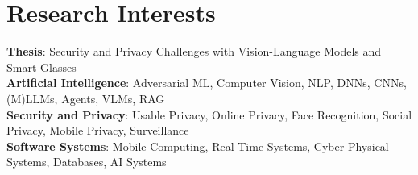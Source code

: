 \section{Research Interests}
 \begin{itemize}[leftmargin=0.5cm, label={}]
    \small{\item{
     \textbf{Thesis}{: Security and Privacy Challenges with Vision-Language Models and Smart Glasses~\cite{hawkeye}} \\\vspace{1pt}
     \textbf{Artificial Intelligence}{: Adversarial ML, Computer Vision, NLP, DNNs, CNNs, (M)LLMs, Agents, VLMs, RAG} \\\vspace{1pt}
     \textbf{Security and Privacy}{: Usable Privacy, Online Privacy, Face Recognition, Social Privacy, Mobile Privacy, Surveillance} \\\vspace{1pt}
     \textbf{Software Systems}{: Mobile Computing, Real-Time Systems, Cyber-Physical Systems, Databases, AI Systems} \\\vspace{1pt}
    }}
 \end{itemize}